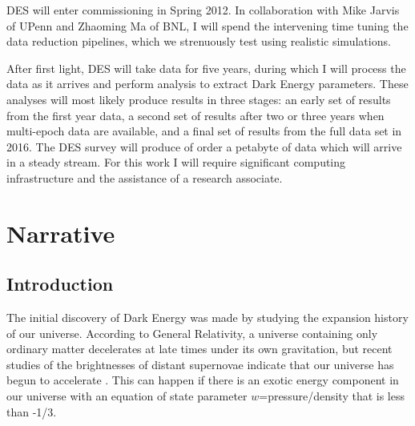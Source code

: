 \documentclass[12pt]{article}
\newcommand{\commissdate}{Spring 2012}
\begin{document}
DES will enter commissioning in \commissdate.  In collaboration with Mike
Jarvis of UPenn and Zhaoming Ma of BNL, I will spend the intervening time
tuning the data reduction pipelines, which we strenuously test using realistic
simulations.  

After first light, DES will take data for five years, during which I will
process the data as it arrives and perform analysis to extract Dark Energy
parameters.  These analyses will most likely produce results in three stages:
an early set of results from the first year data, a second set of results after
two or three years when multi-epoch data are available, and a final set of
results from the full data set in 2016.  The DES survey will produce of order a
petabyte of data which will arrive in a steady stream.  For this work I will
require significant computing infrastructure and the assistance of a
research associate.


\newpage
{}
\section*{Narrative}
\setcounter{section}{1}
\subsection{Introduction}

The initial discovery of Dark Energy was made by studying the expansion history
of our universe.  According to General Relativity, a universe containing only
ordinary matter decelerates at late times under its own gravitation, but recent
studies of the brightnesses of distant supernovae indicate that our universe
has begun to accelerate \cite{Riess98,Perlmutter99}.  This can happen if there
is an exotic energy component in our universe with an equation of state
parameter $w$=pressure/density that is less than -1/3.
\end{document}
